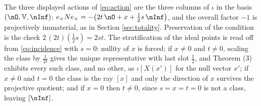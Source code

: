 The three displayed actions of \eqref{eq:action} are the three columns of $\iota$ in the basis $(\nO, \mathbb{V}, \nInf)$: $e_+ N e_+ = -\bigl(2t\,\nO + x + \tfrac12 s\,\nInf\bigr)$, and the overall factor $-1$ is projectively immaterial, as in Section \ref{sec:totality}. Preservation of the condition is the check $2\,(2t)(\tfrac12 s) = 2st$. The stratification of the ideal points is read off from \eqref{eq:incidence} with $s = 0$: nullity of $x$ is forced; if $x \neq 0$ and $t \neq 0$, scaling the class by $\tfrac{1}{2t}$ gives the unique representative with last slot $\tfrac12$, and Theorem (3) exhibits every such class, and no other, as $\iota[X(x')]$ for the null vector $x'$; if $x \neq 0$ and $t = 0$ the class is the ray $[x]$ and only the direction of $x$ survives the projective quotient; and if $x = 0$ then $t \neq 0$, since $s = x = t = 0$ is not a class, leaving $[\nInf]$.
